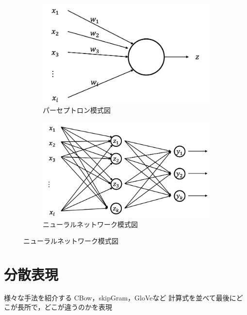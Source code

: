 \documentclass[a4j,11pt,report]{jsbook}
\begin{document}
\begin{figure}[ht]
  \centering
  \begin{subfigure}{0.4\columnwidth }
    \centering
    \includegraphics[width=\columnwidth ]{image/NeuralNet_parceptron.png}
    \caption{パーセプトロン模式図}
    \label{fig:parceptron_image}
  \end{subfigure}

  \begin{subfigure}{0.4\columnwidth }
    \centering
    \includegraphics[width=\columnwidth]{image/forwardNeuralNetwork.png}
    \caption{ニューラルネットワーク模式図}
    \label{fig:NeuralNet_image}

  \end{subfigure}
\end{figure}


\section{分散表現}
様々な手法を紹介する
CBow，skipGram，GloVeなど
計算式を並べて最後にどこが長所で，どこが違うのかを表現
\end{document}

